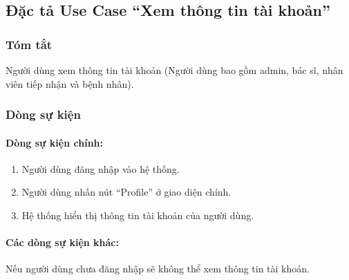\subsection{Đặc tả Use Case ``Xem thông tin tài khoản''}

\subsubsection{Tóm tắt}
Người dùng xem thông tin tài khoản (Người dùng bao gồm admin, bác sĩ, nhân viên tiếp nhận và bệnh nhân).

\subsubsection{Dòng sự kiện}
\paragraph{\textbf{Dòng sự kiện chính:}}
\begin{enumerate}
  \item Người dùng đăng nhập vào hệ thống.
  \item Người dùng nhấn nút ``Profile'' ở giao diện chính.
  \item Hệ thống hiển thị thông tin tài khoản của người dùng.
\end{enumerate}

\paragraph{\textbf{Các dòng sự kiện khác:}}
Nếu người dùng chưa đăng nhập sẽ không thể xem thông tin tài khoản.

